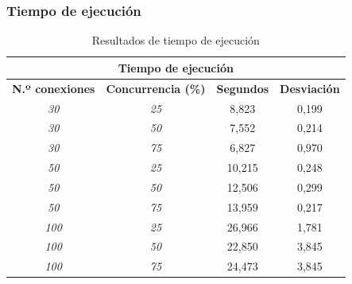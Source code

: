 \subsubsection{Tiempo de ejecución}
\begin{table}[!ht]
	\begin{center}
		\begin{tabular}{|c|c|c|c|}
			\hline
			\multicolumn{4}{|c|}{{\bf Tiempo de ejecución}}                                                           \\ \hline
			{\bf N.º conexiones} & {\bf Concurrencia (\%)} & {\bf Segundos} & {\bf Desviación} \\ \hline
			{\it 30}                   & {\it 25}                  & 8,823              & 0,199                     \\ \hline
			{\it 30}                   & {\it 50}                  & 7,552              & 0,214                     \\ \hline
			{\it 30}                   & {\it 75}                  & 6,827              & 0,970                     \\ \hline
			{\it 50}                   & {\it 25}                  & 10,215             & 0,248                     \\ \hline
			{\it 50}                   & {\it 50}                  & 12,506             & 0,299                     \\ \hline
			{\it 50}                   & {\it 75}                  & 13,959             & 0,217                     \\ \hline
			{\it 100}                  & {\it 25}                  & 26,966             & 1,781                     \\ \hline
			{\it 100}                  & {\it 50}                  & 22,850             & 3,845                     \\ \hline
			{\it 100}                  & {\it 75}                  & 24,473             & 3,845                     \\ \hline
		\end{tabular}
		\caption{Resultados de tiempo de ejecución}
		\label{table:rte}
	\end{center}
\end{table}


